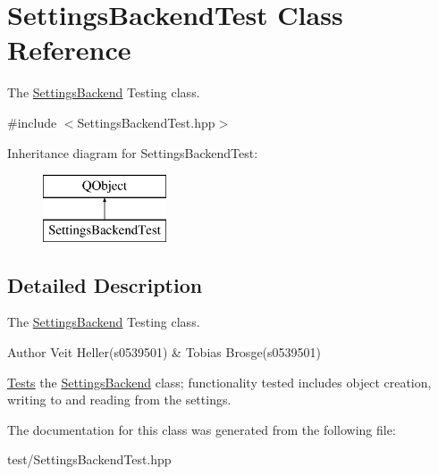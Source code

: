 \hypertarget{classSettingsBackendTest}{\section{Settings\+Backend\+Test Class Reference}
\label{classSettingsBackendTest}
}


The \hyperlink{classSettingsBackend}{Settings\+Backend} Testing class.  




{\ttfamily \#include $<$Settings\+Backend\+Test.\+hpp$>$}

Inheritance diagram for Settings\+Backend\+Test\+:\begin{figure}[H]
\begin{center}
\leavevmode
\includegraphics[height=2.000000cm]{classSettingsBackendTest}
\end{center}
\end{figure}


\subsection{Detailed Description}
The \hyperlink{classSettingsBackend}{Settings\+Backend} Testing class. 

\begin{DoxyAuthor}{Author}
Veit Heller(s0539501) \& Tobias Brosge(s0539501)
\end{DoxyAuthor}
\hyperlink{structTests}{Tests} the \hyperlink{classSettingsBackend}{Settings\+Backend} class; functionality tested includes object creation, writing to and reading from the settings. 

The documentation for this class was generated from the following file\+:\begin{DoxyCompactItemize}
\item 
test/Settings\+Backend\+Test.\+hpp\end{DoxyCompactItemize}
